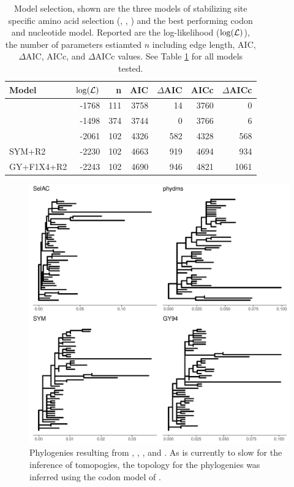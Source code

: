 \documentclass[12pt]{article}
\begin{document}
\begin{table}
  \centering
  \begin{tabular}{lrrrrrr}
    Model		& $\log(\mathcal{L})$ & n & AIC & $\Delta$AIC & AICc & $\Delta$AICc\\ \hline 
    \selacDMS 		& -1768 & 111& 3758& 14	& 3760  & 0\\
    \selac		& -1498 & 374& 3744&  0	& 3766  & 6 \\
    \phydms 		& -2061 & 102& 4326& 582& 4328 & 568\\
    SYM+R2 		& -2230 & 102& 4663& 919& 4694 & 934 \\
    GY+F1X4+R2 		& -2243 & 102& 4690& 946& 4821 & 1061 \\
  \end{tabular}
  \caption{Model selection, shown are the three models of stabilizing site specific amino acid selection (\selac, \selacDMS, \phydms) and the best performing codon and nucleotide model. 
  Reported are the log-likelihood ($\log(\mathcal{L})$), the number of parameters estiamted $n$ including edge length, AIC, $\Delta$AIC, AICc, and $\Delta$AICc values.
  See Table \ref{tab:AIC} for all models tested.}
  \label{tab:AIC}
\end{table}

\begin{figure}[H]
     \centering
	\includegraphics[width=\textwidth]{img/phy_TEM2016.pdf}
	\caption{Phylogenies resulting from \selac, \selacDMS, \phydms, and \gy. As \selac is currently to slow for the inference of tomopogies, the topology for the \selac phylogenies was inferred using the codon model of \citet{KosiolEtAl07}.}
	\label{fig:phylo}
\end{figure}
\end{document}
